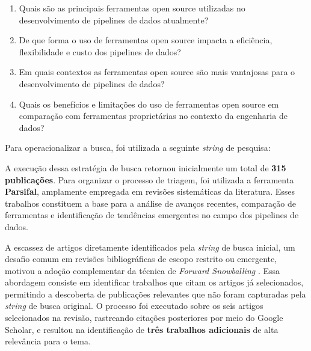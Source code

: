 \begin{enumerate}
 	\item Quais são as principais ferramentas open source utilizadas no desenvolvimento de pipelines de dados atualmente?
 	\item De que forma o uso de ferramentas open source impacta a eficiência, flexibilidade e custo dos pipelines de dados?
 	\item Em quais contextos as ferramentas open source são mais vantajosas para o desenvolvimento de pipelines de dados?
 	\item Quais os benefícios e limitações do uso de ferramentas open source em comparação com ferramentas proprietárias no contexto da engenharia de dados?
\end{enumerate}

Para operacionalizar a busca, foi utilizada a seguinte \textit{string} de pesquisa:




A execução dessa estratégia de busca retornou inicialmente um total de \textbf{315 publicações}. Para organizar o processo de triagem, foi utilizada a ferramenta \textbf{Parsifal}, amplamente empregada em revisões sistemáticas da literatura. Esses trabalhos constituem a base para a análise de avanços recentes, comparação de ferramentas e identificação de tendências emergentes no campo dos pipelines de dados.

A escassez de artigos diretamente identificados pela \textit{string} de busca inicial, um desafio comum em revisões bibliográficas de escopo restrito ou emergente, motivou a adoção complementar da técnica de \textit{Forward Snowballing} \cite[]{felizardo2016using}. Essa abordagem consiste em identificar trabalhos que citam os artigos já selecionados, permitindo a descoberta de publicações relevantes que não foram capturadas pela \textit{string} de busca original. O processo foi executado sobre os seis artigos selecionados na revisão, rastreando citações posteriores por meio do Google Scholar, e resultou na identificação de \textbf{três trabalhos adicionais} de alta relevância para o tema.

